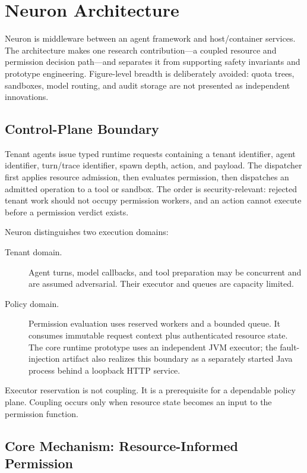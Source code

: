 \section{Neuron Architecture}
\label{sec:arch}

Neuron is middleware between an agent framework and host/container services.
The architecture makes one research contribution---a coupled resource and
permission decision path---and separates it from supporting safety
invariants and prototype engineering. Figure-level breadth is deliberately
avoided: quota trees, sandboxes, model routing, and audit storage are not
presented as independent innovations.

\subsection{Control-Plane Boundary}

Tenant agents issue typed runtime requests containing a tenant identifier,
agent identifier, turn/trace identifier, spawn depth, action, and payload.
The dispatcher first applies resource admission, then evaluates permission,
then dispatches an admitted operation to a tool or sandbox. The order is
security-relevant: rejected tenant work should not occupy permission workers,
and an action cannot execute before a permission verdict exists.

Neuron distinguishes two execution domains:

\begin{description}
  \item[Tenant domain.] Agent turns, model callbacks, and tool preparation
  may be concurrent and are assumed adversarial. Their executor and queues
  are capacity limited.
  \item[Policy domain.] Permission evaluation uses reserved workers and a
  bounded queue. It consumes immutable request context plus authenticated
  resource state. The core runtime prototype uses an independent JVM
  executor; the fault-injection artifact also realizes this boundary as a
  separately started Java process behind a loopback HTTP service.
\end{description}

Executor reservation is not coupling. It is a prerequisite for a dependable
policy plane. Coupling occurs only when resource state becomes an input to
the permission function.

\subsection{Core Mechanism: Resource-Informed Permission}
\label{sec:arch-coupling}

